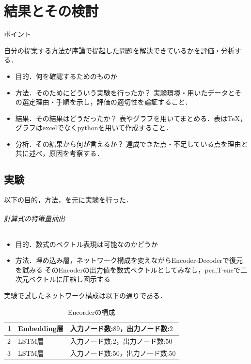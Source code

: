 \documentclass[a4j,11pt,report]{jsbook}
\newcommand{\point}[1]{
\begin{itembox}[l]{ポイント}
  #1
\end{itembox}
}
\begin{document}
\chapter{結果とその検討 \label{ch:result}}
\point{
自分の提案する方法が序論で提起した問題を解決できているかを評価・分析する．
\begin{itemize}
  \item 目的．何を確認するためのものか
  \item 方法．そのためにどういう実験を行ったか？ 実験環境・用いたデータとその選定理由・手順を示し，評価の適切性を論証すること．
  \item 結果．その結果はどうだったか？ 表やグラフを用いてまとめる．表はTeX，グラフはexcelでなくpythonを用いて作成すること．
  \item 分析．その結果から何が言えるか？ 達成できた点・不足している点を理由と共に述べ，原因を考察する．
\end{itemize}
}
\fi

\section{実験}
以下の目的，方法，を元に実験を行った．
\subparagraph{計算式の特徴量抽出}
\begin{itemize}
  \item 目的．数式のベクトル表現は可能なのかどうか
  \item 方法．埋め込み層，ネットワーク構成を変えながらEncoder-Decoderで復元を試みる
  そのEncoderの出力値を数式ベクトルとしてみなし，pca,T-sneで二次元ベクトルに圧縮し図示する
\end{itemize}

実験で試したネットワーク構成は以下の通りである．


\begin{table}[hbt]
  \begin{center}
    \caption{Encorderの構成}
    \label{table:Encorder}
    \begin{tabularx}{0.9\linewidth}{|l|l|X|}
      \hline
      1 & Embedding層 & 入力ノード数:$89$，出力ノード数:$2$ \\
      \hline
      2 & LSTM層 & 入力ノード数:$2$，出力ノード数:$50$ \\
      \hline
      3 & LSTM層 & 入力ノード数:$50$，出力ノード数:$50$ \\
      \hline
    \end{tabularx}
  \end{center}
\end{table}
\end{document}
